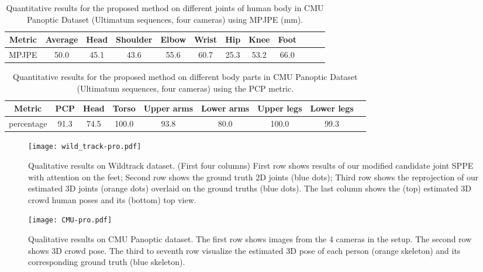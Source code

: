 \documentclass[runningheads]{llncs}
\begin{document}
\begin{table}[!hbt]
\vskip-1cm
\setlength{\tabcolsep}{8pt}
\scriptsize
\caption{Quantitative results for the proposed method on different joints of human body in CMU Panoptic Dataset (Ultimatum sequences, four cameras) using MPJPE (mm).}
\scriptsize
\begin{center}
\begin{tabular}{c|c|cccccccccc} 
\hline
Metric &\textbf{Average} & Head & Shoulder & Elbow & Wrist &  Hip & Knee & Foot\\
\hline\hline
MPJPE & 50.0 & 45.1 & 43.6  & 55.6 & 60.7 & 25.3 & 53.2 & 66.0 \\
\hline
\end{tabular}
\end{center}
\label{tab:CMU MPJPE}
\end{table}
\begin{table}[!hbt]
\vskip-1cm
\setlength{\tabcolsep}{6pt}
\scriptsize
\caption{Quantitative results for the proposed method on different body parts in CMU Panoptic Dataset (Ultimatum sequences, four cameras) using the PCP metric.}
\scriptsize
\begin{center}
\begin{tabular}{c|c|ccccccc} 
\hline
Metric &\textbf{PCP}  & Head & Torso & Upper arms &  Lower arms & Upper legs & Lower legs\\
\hline\hline
percentage & 91.3 & 74.5 & 100.0 & 93.8 & 80.0 & 100.0 & 99.3 \\
\hline
\end{tabular}
\end{center}
\label{tab:CMU PCP}
\end{table}
\begin{figure*}[!hbt]
  \centering
\texttt{[image: wild\_track-pro.pdf]}
  \caption{Qualitative results on Wildtrack dataset. (First four columns) First row shows results of our modified candidate joint SPPE with attention on the feet; Second row shows the ground truth 2D joints (blue dots); Third row shows the reprojection of our estimated 3D joints (orange dots) overlaid on the ground truths (blue dots).
  The last column shows the (top) estimated 3D crowd human poses and its (bottom) top view.
}\label{fig:5}
\end{figure*}
\begin{figure*}[!hbt]
  \centering
  \texttt{[image: CMU-pro.pdf]}
  \caption{Qualitative results on 
CMU Panoptic dataset. 
The first row shows images from the 4 cameras in the setup.
The second row shows 3D crowd pose. The third to seventh row visualize the estimated 3D pose of each person (orange skeleton) and its corresponding ground truth (blue skeleton).
}
  \label{fig:6}
\end{figure*}
\end{document}
